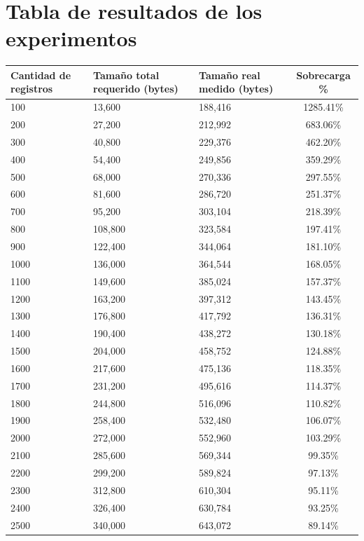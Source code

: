 \chapter{Tabla de resultados de los experimentos}
\begin{table}[h]
\centering
\begin{tabular}{|l|p{4cm}|p{4cm}|c|}
\hline
\textbf{Cantidad de registros} & \textbf{Tamaño total requerido (bytes)} & \textbf{Tamaño real medido (bytes)} & \textbf{Sobrecarga \%} \\ \hline
100 & 13,600 & 188,416 & 1285.41\% \\ \hline
200 & 27,200 & 212,992 & 683.06\% \\ \hline
300 & 40,800 & 229,376 & 462.20\% \\ \hline
400 & 54,400 & 249,856 & 359.29\% \\ \hline
500 & 68,000 & 270,336 & 297.55\% \\ \hline
600 & 81,600 & 286,720 & 251.37\% \\ \hline
700 & 95,200 & 303,104 & 218.39\% \\ \hline
800 & 108,800 & 323,584 & 197.41\% \\ \hline
900 & 122,400 & 344,064 & 181.10\% \\ \hline
1000 & 136,000 & 364,544 & 168.05\% \\ \hline
1100 & 149,600 & 385,024 & 157.37\% \\ \hline
1200 & 163,200 & 397,312 & 143.45\% \\ \hline
1300 & 176,800 & 417,792 & 136.31\% \\ \hline
1400 & 190,400 & 438,272 & 130.18\% \\ \hline
1500 & 204,000 & 458,752 & 124.88\% \\ \hline
1600 & 217,600 & 475,136 & 118.35\% \\ \hline
1700 & 231,200 & 495,616 & 114.37\% \\ \hline
1800 & 244,800 & 516,096 & 110.82\% \\ \hline
1900 & 258,400 & 532,480 & 106.07\% \\ \hline
2000 & 272,000 & 552,960 & 103.29\% \\ \hline
2100 & 285,600 & 569,344 & 99.35\% \\ \hline
2200 & 299,200 & 589,824 & 97.13\% \\ \hline
2300 & 312,800 & 610,304 & 95.11\% \\ \hline
2400 & 326,400 & 630,784 & 93.25\% \\ \hline
2500 & 340,000 & 643,072 & 89.14\% \\ \hline

\end{tabular}
\end{table}
